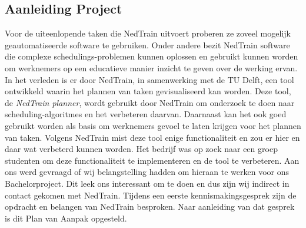 \subsection{Aanleiding Project}
Voor de uiteenlopende taken die NedTrain uitvoert proberen ze zoveel mogelijk geautomatiseerde software te gebruiken. Onder andere bezit NedTrain software die complexe schedulings-problemen kunnen oplossen en gebruikt kunnen worden om werknemers op een educatieve manier inzicht te geven over de werking ervan. In het verleden is er door NedTrain, in samenwerking met de TU Delft, een tool ontwikkeld waarin het plannen van taken gevisualiseerd kan worden. Deze tool, de \emph{NedTrain planner}, wordt gebruikt door NedTrain om onderzoek te doen naar scheduling-algoritmes en het verbeteren daarvan. Daarnaast kan het ook goed gebruikt worden als basis om werknemers gevoel te laten krijgen voor het plannen van taken. Volgens NedTrain mist deze tool enige functionaliteit en zou er hier en daar wat verbeterd kunnen worden. Het bedrijf was op zoek naar een groep studenten om deze functionaliteit te implementeren en de tool te verbeteren. Aan ons werd gevraagd of wij belangstelling hadden om hieraan te werken voor ons Bachelorproject. Dit leek ons interessant om te doen en dus zijn wij indirect in contact gekomen met NedTrain. Tijdens een eerste kennismakingsgesprek zijn de opdracht en belangen van NedTrain besproken. Naar aanleiding van dat gesprek is dit Plan van Aanpak opgesteld.
